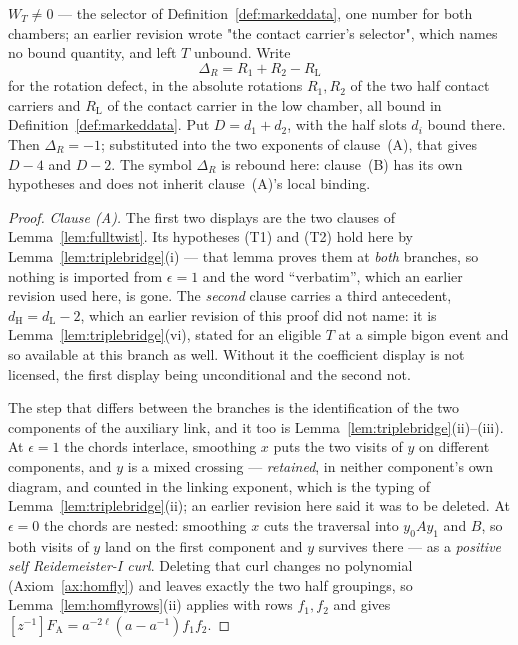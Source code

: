 \begin{lemma}
\begin{enumerate}
$W_T\neq0$ --- the selector of Definition~\ref{def:markeddata}, one number for
both chambers; an earlier revision wrote "the contact carrier's selector",
which names no bound quantity, and left $T$ unbound. Write
\[
   \Delta_R=R_1+R_2-R_{\mathrm L}
\]
for the rotation defect, in the absolute rotations $R_1,R_2$ of the two half
contact carriers and $R_{\mathrm L}$ of the contact carrier in the low chamber, all bound in
Definition~\ref{def:markeddata}. Put $D=d_1+d_2$, with the half slots $d_i$
bound there. Then $\Delta_R=-1$; substituted into the two exponents of clause~(A),
that gives $D-4$ and $D-2$. The symbol $\Delta_R$ is rebound here: clause~(B)
has its own hypotheses and does not inherit clause~(A)'s local binding.
\end{enumerate}
\end{lemma}
\begin{proof}
\emph{Clause (A).} The first two displays are the two clauses of Lemma~\ref{lem:fulltwist}. Its
hypotheses (T1) and (T2) hold here by Lemma~\ref{lem:triplebridge}(i) --- that
lemma proves them at \emph{both} branches, so nothing is imported from
$\epsilon=1$ and the word ``verbatim'', which an earlier revision used here, is
gone. The \emph{second} clause carries a third antecedent,
$d_{\mathrm H}=d_{\mathrm L}-2$, which an earlier revision of this proof did not
name: it is Lemma~\ref{lem:triplebridge}(vi), stated for an eligible $T$ at a simple
bigon event and so available at this branch as well. Without it the coefficient
display is not licensed, the first display being unconditional and the second
not.

The step that differs between the branches is the identification of the two
components of the auxiliary link, and it too is
Lemma~\ref{lem:triplebridge}(ii)--(iii). At $\epsilon=1$ the chords interlace,
smoothing $x$ puts the two visits of $y$ on different components, and $y$ is a
mixed crossing --- \emph{retained}, in neither component's own diagram, and
counted in the linking exponent, which is the typing of
Lemma~\ref{lem:triplebridge}(ii); an earlier revision here said it was to be
deleted. At $\epsilon=0$ the chords are nested: smoothing
$x$ cuts the
traversal into $y_0Ay_1$ and $B$, so both visits of $y$ land on the first
component and $y$ survives there --- as a \emph{positive self Reidemeister-I
curl}. Deleting that curl changes no polynomial (Axiom~\ref{ax:homfly}) and
leaves exactly the two half groupings, so Lemma~\ref{lem:homflyrows}(ii) applies with rows
$f_1,f_2$ and gives $[z^{-1}]F_{\mathrm A}=a^{-2\ell}(a-a^{-1})f_1f_2$.


\end{proof}
